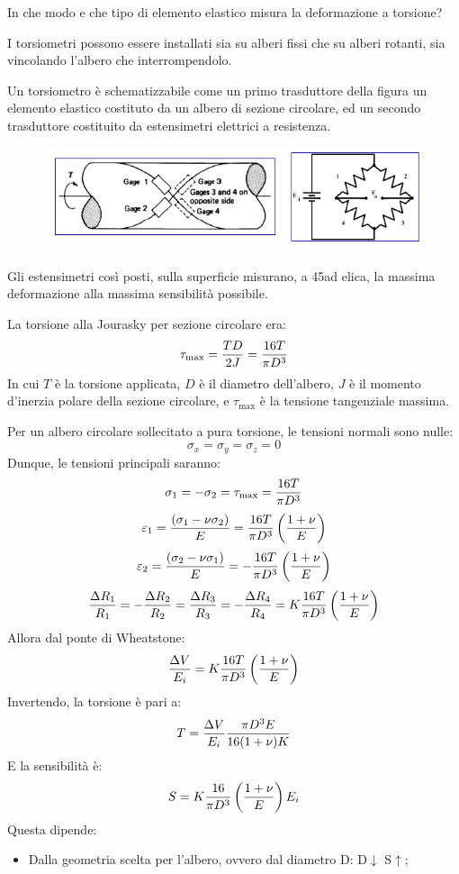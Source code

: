 \documentclass[a4paper, 15pt]{article}
\begin{document}
\begin{adjustwidth}{2in}{}	
 		In che modo e che tipo di elemento elastico misura la deformazione a torsione? \newline 
 		
 		I torsiometri possono essere installati sia su alberi fissi che su alberi rotanti, sia vincolando l'albero che interrompendolo. \newline 
 		
 		Un torsiometro è schematizzabile come un primo trasduttore della figura un elemento elastico costituto da un albero di sezione circolare, ed un secondo trasduttore costituito da estensimetri elettrici a resistenza.  		
 		\begin{figure}[H]
 			\centering
 			\includegraphics[width=0.5\linewidth]{immagini/screenshot008}
 			\label{fig:screenshot008}
 		\end{figure} 	 		
 		Gli estensimetri così posti, sulla superficie misurano, a 45\degree ad elica, la massima deformazione alla massima sensibilità possibile. \newline 
 		
 		La torsione alla Jourasky per sezione circolare era: 
 		\[\tau_{\text{max}} = {TD\over2J} = {16T\over\pi D^3}\]
 		In cui $T$ è la torsione applicata, $D$ è il diametro dell'albero, $J$ è il momento d'inerzia polare della sezione circolare, e  $\tau_{\text{max}}$ è la tensione tangenziale massima. \newline 
 		
 		Per un albero circolare sollecitato a pura torsione, le tensioni normali sono nulle: 
 		\[\sigma_x = \sigma_y = \sigma_z = 0\]
 		Dunque, le tensioni principali saranno: 
 		\[\sigma_1 = - \sigma_2 = \tau_{\text{max}} = {16T\over\pi D^3}\]
 		\[\varepsilon_1 = \dfrac{(\sigma_1-\nu\sigma_2)}{E} = {16T\over\pi D^3}\left(1+\nu\over E\right)\]
 		\[\varepsilon_2 = \dfrac{(\sigma_2-\nu\sigma_1)}{E} = -{16T\over\pi D^3}\left(1+\nu\over E\right)\]
 		\[{\Delta R_1\over R_1} = -{\Delta R_2\over R_2} = {\Delta R_3\over R_3}  = - {\Delta R_4\over R_4}  =K{16T\over\pi D^3}\left(1+\nu\over E\right) \]
 		Allora dal ponte di Wheatstone:
 		\[ {\Delta V\over E_i} =K{16T\over\pi D^3}\left(1+\nu\over E\right) \]
 		Invertendo, la torsione è pari a:
 		\[ T = {\Delta V\over E_i} \dfrac{\pi D^3E}{16(1+\nu)K}\]
 		E la sensibilità è: 
 		\[S = K{16\over\pi D^3}\left(1+\nu\over E\right)E_i\]
 		Questa dipende:
 		\begin{itemize}
 			\item Dalla geometria scelta per l'albero, ovvero dal
 			diametro D: D$\downarrow$ S$\uparrow$;
 			

\end{itemize}
\end{adjustwidth}
\end{document}
